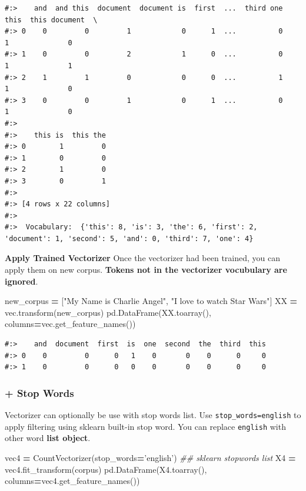 \documentclass[
]{book}
\newenvironment{Shaded}{\begin{snugshade}}{\end{snugshade}}
\newcommand{\CommentTok}[1]{\textcolor[rgb]{0.37,0.37,0.37}{\textit{#1}}}
\newcommand{\NormalTok}[1]{#1}
\newcommand{\OperatorTok}[1]{\textcolor[rgb]{0.43,0.43,0.43}{\textbf{#1}}}
\newcommand{\StringTok}[1]{\textcolor[rgb]{0.5,0.5,0.5}{#1}}
\begin{document}
\begin{verbatim}
#:>    and  and this  document  document is  first  ...  third one  this  this document  \
#:> 0    0         0         1            0      1  ...          0     1              0   
#:> 1    0         0         2            1      0  ...          0     1              1   
#:> 2    1         1         0            0      0  ...          1     1              0   
#:> 3    0         0         1            0      1  ...          0     1              0   
#:> 
#:>    this is  this the  
#:> 0        1         0  
#:> 1        0         0  
#:> 2        1         0  
#:> 3        0         1  
#:> 
#:> [4 rows x 22 columns] 
#:> 
#:>  Vocabulary:  {'this': 8, 'is': 3, 'the': 6, 'first': 2, 'document': 1, 'second': 5, 'and': 0, 'third': 7, 'one': 4}
\end{verbatim}

\textbf{Apply Trained Vectorizer} Once the vectorizer had been trained, you can apply them on new corpus. \textbf{Tokens not in the vectorizer vocubulary are ignored}.

\begin{Shaded}
\begin{Highlighting}[]
\NormalTok{new_corpus }\OperatorTok{=}\NormalTok{ [}\StringTok{"My Name is Charlie Angel"}\NormalTok{, }\StringTok{"I love to watch Star Wars"}\NormalTok{]}
\NormalTok{XX }\OperatorTok{=}\NormalTok{ vec.transform(new_corpus)}
\NormalTok{pd.DataFrame(XX.toarray(), columns}\OperatorTok{=}\NormalTok{vec.get_feature_names())}
\end{Highlighting}
\end{Shaded}

\begin{verbatim}
#:>    and  document  first  is  one  second  the  third  this
#:> 0    0         0      0   1    0       0    0      0     0
#:> 1    0         0      0   0    0       0    0      0     0
\end{verbatim}

\hypertarget{stop-words}{%
\subsubsection{+ Stop Words}\label{stop-words}}

Vectorizer can optionally be use with stop words list. Use \texttt{stop\_words=english} to apply filtering using sklearn built-in stop word. You can replace \texttt{english} with other word \textbf{list object}.

\begin{Shaded}
\begin{Highlighting}[]
\NormalTok{vec4 }\OperatorTok{=}\NormalTok{ CountVectorizer(stop_words}\OperatorTok{=}\StringTok{'english'}\NormalTok{) }\CommentTok{## sklearn stopwords list}
\NormalTok{X4 }\OperatorTok{=}\NormalTok{ vec4.fit_transform(corpus)}
\NormalTok{pd.DataFrame(X4.toarray(), columns}\OperatorTok{=}\NormalTok{vec4.get_feature_names())}
\end{Highlighting}
\end{Shaded}
\end{document}

